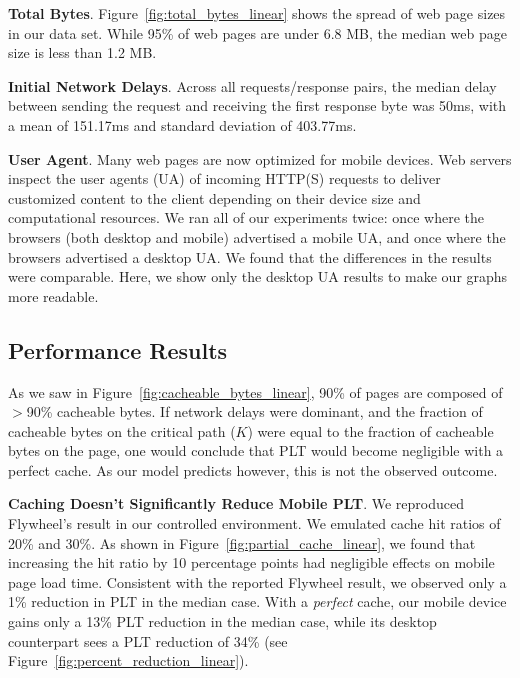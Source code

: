 \textbf{Total Bytes}. Figure~\ref{fig:total_bytes_linear} shows the spread of web page sizes in our data set. While 95\% of web pages are under 6.8 MB, the median web page size is less than 1.2 MB.

\textbf{Initial Network Delays}. Across all requests/response pairs, the median delay between sending the request and receiving the first response byte was 50ms, with a mean of 151.17ms and standard deviation of 403.77ms.

\textbf{User Agent}. Many web pages are now optimized for mobile devices. Web
servers inspect the user agents (UA) of incoming HTTP(S) requests to deliver
customized content to the client depending on their device size and
computational resources. We ran all of our experiments twice: once where the
browsers (both desktop and mobile) advertised a mobile UA, and once where the
browsers advertised a desktop UA. We found that the differences in the results
were comparable. Here, we show only the desktop UA results to make our graphs more readable.

\subsection{Performance Results}
As we saw in Figure~\ref{fig:cacheable_bytes_linear}, 90\% of pages are composed of $>$90\% cacheable bytes.
If network delays were dominant, and the fraction of cacheable bytes on the critical path ($K$) were equal to the fraction of cacheable bytes on the page, one would conclude that PLT would become negligible with a perfect cache. As our model predicts however, this is not the observed outcome.

\textbf{Caching Doesn't Significantly Reduce Mobile PLT}.
We reproduced Flywheel's result in our controlled environment.
We emulated cache hit ratios of 20\% and 30\%. As shown in Figure~\ref{fig:partial_cache_linear}, we found that increasing the hit ratio by 10 percentage points had negligible effects on mobile page load time. Consistent with the reported Flywheel result, we observed only a 1\% reduction in PLT in the median case.
With a {\em perfect} cache, our mobile device gains only a 13\% PLT reduction in the median case, while its desktop counterpart sees a  PLT reduction of 34\% (see Figure~\ref{fig:percent_reduction_linear}).


